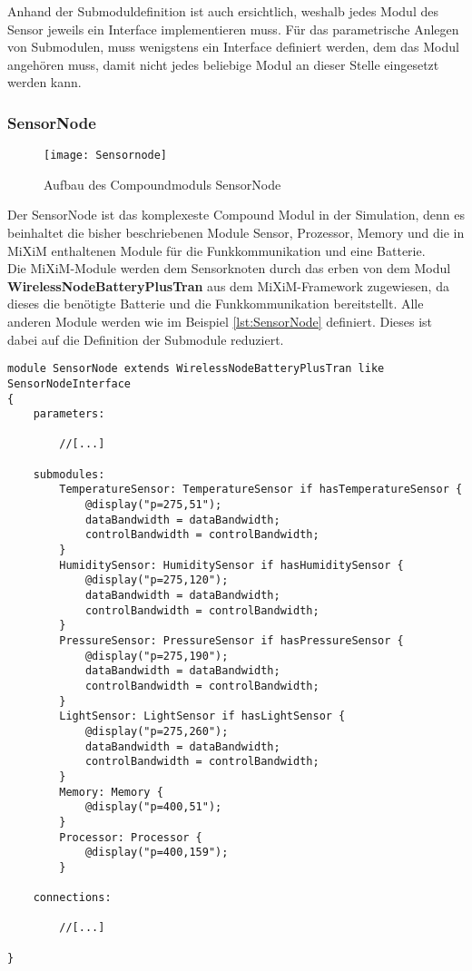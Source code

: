 Anhand der Submoduldefinition ist auch ersichtlich, weshalb jedes Modul des Sensor jeweils ein Interface implementieren muss. Für das parametrische Anlegen von Submodulen, muss wenigstens ein Interface definiert werden, dem das Modul angehören muss, damit nicht jedes beliebige Modul an dieser Stelle eingesetzt werden kann.

\subsubsection{SensorNode}

\begin{figure}[htbp]
\centering
\caption{Aufbau des Compoundmoduls SensorNode}
\label{fig:Sensornode}
\texttt{[image: Sensornode]}
\end{figure}

Der SensorNode ist das komplexeste Compound Modul in der Simulation, denn es beinhaltet die bisher beschriebenen Module Sensor, Prozessor, Memory und die in MiXiM enthaltenen Module für die Funkkommunikation und eine Batterie.\\
Die MiXiM-Module werden dem Sensorknoten durch das erben von dem Modul \textbf{WirelessNodeBatteryPlusTran} aus dem MiXiM-Framework zugewiesen, da dieses die benötigte Batterie und die Funkkommunikation bereitstellt. Alle anderen Module werden wie im Beispiel \ref{lst:SensorNode} definiert. Dieses ist dabei auf die Definition der Submodule reduziert.

\begin{lstlisting}[language=ned,caption={SensorNode mit den neu definierten Modulen},label=lst:SensorNode]
module SensorNode extends WirelessNodeBatteryPlusTran like SensorNodeInterface
{
    parameters:
    
        //[...]

    submodules:
        TemperatureSensor: TemperatureSensor if hasTemperatureSensor {
            @display("p=275,51");
            dataBandwidth = dataBandwidth;
            controlBandwidth = controlBandwidth;
        }
        HumiditySensor: HumiditySensor if hasHumiditySensor {
            @display("p=275,120");
            dataBandwidth = dataBandwidth;
            controlBandwidth = controlBandwidth;
        }
        PressureSensor: PressureSensor if hasPressureSensor {
            @display("p=275,190");
            dataBandwidth = dataBandwidth;
            controlBandwidth = controlBandwidth;
        }
        LightSensor: LightSensor if hasLightSensor {
            @display("p=275,260");
            dataBandwidth = dataBandwidth;
            controlBandwidth = controlBandwidth;
        }
        Memory: Memory {
            @display("p=400,51");
        }
        Processor: Processor {
            @display("p=400,159");
        }
        
    connections:
    
        //[...]
        
}        
\end{lstlisting}

